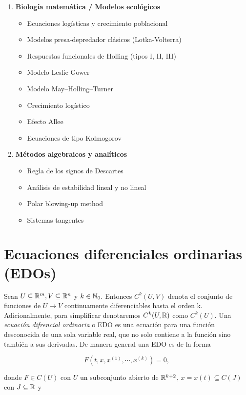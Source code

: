 \begin{enumerate}
	\item \textbf{Biología matemática / Modelos ecológicos}
	\begin{itemize}
		\item Ecuaciones logísticas y crecimiento poblacional
		\item Modelos presa-depredador clásicos (Lotka-Volterra)
		\item Respuestas funcionales de Holling (tipos I, II, III)
		\item Modelo Leslie-Gower
		\item Modelo May–Holling–Turner
		\item Crecimiento logístico
		\item Efecto Allee
		\item Ecuaciones de tipo Kolmogorov
	\end{itemize}
	
	\item \textbf{Métodos algebraicos y analíticos}
	\begin{itemize}
		\item Regla de los signos de Descartes
		\item Análisis de estabilidad lineal y no lineal
		\item Polar blowing-up method
		\item Sistemas tangentes
	\end{itemize}
\end{enumerate}

\section{Ecuaciones diferenciales ordinarias (EDOs)}

Sean $U \subseteq {\mathbb{R}}^{m}, V \subseteq {\mathbb{R}}^{n}$ y $k\in {\mathbb{N}}_{0}$. Entonces $C^{k}(U, V)$ denota el conjunto de funciones de $U \longrightarrow V$ continuamente diferenciables hasta el orden k. Adicionalmente, para simplificar denotaremos $C^{k}(U, {\mathbb{R}})$ como $C^{k}(U)$. Una \textit{ecuación difrencial ordinaria} o EDO es una ecuación para una función desconocida de una sola variable real, que no solo contiene a la función sino también a sus derivadas. De manera general una EDO es de la forma

\begin{equation}
	F(t, x, x^{(1)}, \cdots, x^{(k)}) = 0,
	\label{eq: generalFormEDO}
\end{equation}

donde $F \in C(U)$ con $U$ un subconjunto abierto de ${\mathbb{R}}^{k+2}$, $x = x(t) \subseteq C(J)$ con $J \subseteq {\mathbb{R}}$ y

